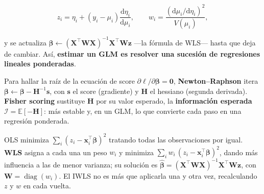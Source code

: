 \documentclass[
  letterpaper,
  DIV=11,
  numbers=noendperiod]{scrartcl}
\begin{document}
\[
z_i=\eta_i+(y_i-\mu_i)\frac{\mathrm{d}\eta_i}{\mathrm{d}\mu_i},
\qquad
w_i=\frac{(\mathrm{d}\mu_i/\mathrm{d}\eta_i)^2}{V(\mu_i)},
\]

y se actualiza
\(\boldsymbol\beta\leftarrow(\mathbf{X}^\top\mathbf{W}\mathbf{X})^{-1} \mathbf{X}^\top\mathbf{W}\mathbf{z}\)
---la fórmula de WLS--- hasta que deja de cambiar. Así, \textbf{estimar
un GLM es resolver una sucesión de regresiones lineales ponderadas}.

\begin{tcolorbox}[enhanced jigsaw, coltitle=black, rightrule=.15mm, arc=.35mm, leftrule=.75mm, colback=white, colbacktitle=quarto-callout-note-color!10!white, left=2mm, breakable, toptitle=1mm, toprule=.15mm, bottomtitle=1mm, titlerule=0mm, title=\textcolor{quarto-callout-note-color}{\faInfo}\hspace{0.5em}{Recordatorio: Newton--Raphson y Fisher scoring}, bottomrule=.15mm, opacityback=0, opacitybacktitle=0.6, colframe=quarto-callout-note-color-frame]

Para hallar la raíz de la ecuación de score
\(\partial\ell/\partial\boldsymbol\beta=\mathbf{0}\),
\textbf{Newton--Raphson} itera
\(\boldsymbol\beta\leftarrow\boldsymbol\beta-\mathbf{H}^{-1}\mathbf{s}\),
con \(\mathbf{s}\) el score (gradiente) y \(\mathbf{H}\) el hessiano
(segunda derivada). \textbf{Fisher scoring} sustituye \(\mathbf{H}\) por
su valor esperado, la \textbf{información esperada}
\(\mathcal{I}=\mathbb{E}[-\mathbf{H}]\): más estable y, en un GLM, lo
que convierte cada paso en una regresión ponderada.

\end{tcolorbox}

\begin{tcolorbox}[enhanced jigsaw, coltitle=black, rightrule=.15mm, arc=.35mm, leftrule=.75mm, colback=white, colbacktitle=quarto-callout-note-color!10!white, left=2mm, breakable, toptitle=1mm, toprule=.15mm, bottomtitle=1mm, titlerule=0mm, title=\textcolor{quarto-callout-note-color}{\faInfo}\hspace{0.5em}{Recordatorio: mínimos cuadrados ponderados (WLS)}, bottomrule=.15mm, opacityback=0, opacitybacktitle=0.6, colframe=quarto-callout-note-color-frame]

OLS minimiza \(\sum_i (z_i-\mathbf{x}_i^\top\boldsymbol\beta)^2\)
tratando todas las observaciones por igual. \textbf{WLS} asigna a cada
una un peso \(w_i\) y minimiza
\(\sum_i w_i\,(z_i-\mathbf{x}_i^\top\boldsymbol\beta)^2\), dando más
influencia a las de menor varianza; su solución es
\(\hat{\boldsymbol\beta}=(\mathbf{X}^\top\mathbf{W}\mathbf{X})^{-1} \mathbf{X}^\top\mathbf{W}\mathbf{z}\),
con \(\mathbf{W}=\operatorname{diag}(w_i)\). El IWLS no es más que
aplicarla una y otra vez, recalculando \(z\) y \(w\) en cada vuelta.

\end{tcolorbox}
\end{document}
